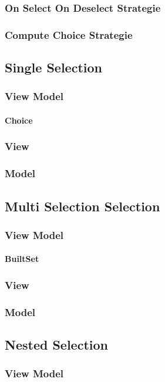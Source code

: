 \documentclass[12pt, twoside]{article}
\begin{document}
\subsubsection{On Select On Deselect Strategie}
\subsubsection{Compute Choice Strategie}


\subsection{Single Selection}
\subsubsection{View Model}
\paragraph{Choice}
\subsubsection{View}
\subsubsection{Model}

\subsection{Multi Selection Selection}
\subsubsection{View Model}
\paragraph{BuiltSet}
\subsubsection{View}
\subsubsection{Model}

\subsection{Nested Selection}
\subsubsection{View Model}
\end{document}
